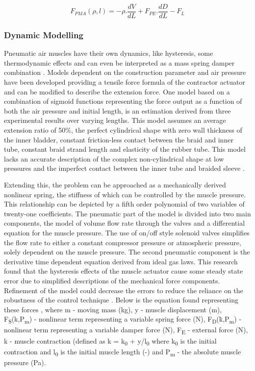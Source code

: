 \documentclass[11pt,a4paper]{article}
\begin{document}
\begin{equation}
F_{PMA}(\rho, l) = -\rho.\frac{dV}{dL}+F_{PE}.\frac{dD}{dL}-F_L
\label{math:staticforce}
\end{equation}

\subsubsection{Dynamic Modelling}
\label{sub:dynamic_modelling}
Pneumatic air muscles have their own dynamics, like hysteresis, some thermodynamic effects and can even be interpreted as a mass spring damper combination \cite{martens_boblan_2017}. Models dependent on the construction parameter and air pressure have been developed providing a tensile force formula of the contractor actuator and can be modified to describe the extension force. One model based on a combination of sigmoid functions representing the force output as a function of both the air pressure and initial length, is an estimation derived from three experimental results over varying lengths. This model assumes an average extension ratio of 50\%, the perfect cylindrical shape with zero wall thickness of the inner bladder, constant friction-less contact between the braid and inner tube, constant braid strand length and elasticity of the rubber tube. This model lacks an accurate description of the complex non-cylindrical shape at low pressures and the imperfect contact between the inner tube and braided sleeve \cite{al-ibadi_nefti-meziani_davis_2018}. \newline

Extending this, the problem can be approached as a mechanically derived nonlinear spring, the stiffness of which can be controlled by the muscle pressure. This relationship can be depicted by a fifth order polynomial of two variables of twenty-one coefficients. The pneumatic part of the model is divided into two main components, the model of volume flow rate through the valves and a differential equation for the muscle pressure. The use of on/off style solenoid valves simplifies the flow rate to either a constant compressor pressure or atmospheric pressure, solely dependent on the muscle pressure. The second pneumatic component is the derivative time dependent equation derived from ideal gas laws. This research found that the hysteresis effects of the muscle actuator cause some steady state error due to simplified descriptions of the mechanical force components. Refinement of the model could decrease the errors to reduce the reliance on the robustness of the control technique \cite{hosovsky_2012}. Below is the equation found representing these forces , where m - moving mass (kg), y - muscle displacement (m), F\textsubscript{S}(k,P\textsubscript{m}) - nonlinear term representing a variable spring force (N), F\textsubscript{D}(\.{k},P\textsubscript{m}) - nonlinear term representing a variable damper force (N), F\textsubscript{E} - external force (N), k - muscle contraction (defined as k = k\textsubscript{0} + y/l\textsubscript{0} where k\textsubscript{0} is the initial contraction and l\textsubscript{0} is the initial muscle length (-) and P\textsubscript{m} - the absolute muscle pressure (Pa).
\end{document}
